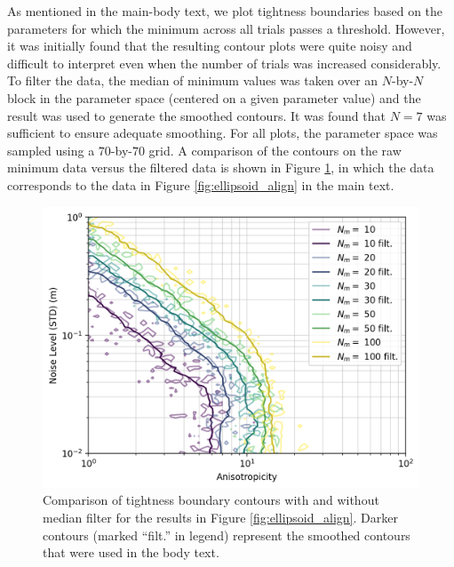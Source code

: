 \documentclass[lettersize,journal]{IEEEtran}
\newcommand{\rev}[1]{\color{red}{#1}\color{black}}
\begin{document}
As mentioned in the main-body text, we plot tightness boundaries based on the parameters for which the minimum \rev{ER } across all trials passes a threshold. However, it was initially found that the resulting contour plots were quite noisy and difficult to interpret even when the number of trials was increased considerably. To filter the data, the median of minimum \rev{ER } values was taken over an $N$-by-$N$ block in the parameter space (centered on a given parameter value) and the result was used to generate the smoothed contours. It was found that $N=7$ was sufficient to ensure adequate smoothing. For all plots, the parameter space was sampled using a $70$-by-$70$ grid. A comparison of the contours on the raw minimum \rev{ER } data versus the filtered data is shown in Figure \ref{fig:filter}, in which the data corresponds to the data in Figure \ref{fig:ellipsoid_align} in the main text. 
\begin{figure}[!ht]
	\centering
	\includegraphics[width=\columnwidth]{figs/filter_compare}
	\caption{Comparison of tightness boundary contours with and without median filter for the results in Figure \ref{fig:ellipsoid_align}. Darker contours (marked ``filt.'' in legend) represent the smoothed contours that were used in the body text.}
	\label{fig:filter}
\end{figure}

\vfill
\end{document}
